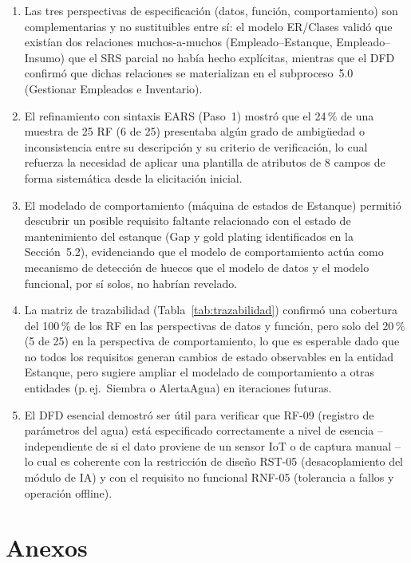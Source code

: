 \documentclass[11pt,a4paper]{report}
\begin{document}
\begin{enumerate}[leftmargin=1.2cm]
\item Las tres perspectivas de especificaci\'on (datos, funci\'on, comportamiento) son complementarias y no sustituibles entre s\'i: el modelo ER/Clases valid\'o que exist\'ian dos relaciones muchos-a-muchos (Empleado--Estanque, Empleado--Insumo) que el SRS parcial no hab\'ia hecho expl\'icitas, mientras que el DFD confirm\'o que dichas relaciones se materializan en el subproceso~5.0 (Gestionar Empleados e Inventario).
\item El refinamiento con sintaxis EARS (Paso~1) mostr\'o que el 24\,\% de una muestra de 25 RF (6 de 25) presentaba alg\'un grado de ambig\"uedad o inconsistencia entre su descripci\'on y su criterio de verificaci\'on, lo cual refuerza la necesidad de aplicar una plantilla de atributos de 8 campos de forma sistem\'atica desde la elicitaci\'on inicial.
\item El modelado de comportamiento (m\'aquina de estados de Estanque) permiti\'o descubrir un posible requisito faltante relacionado con el estado de mantenimiento del estanque (Gap y gold plating identificados en la Secci\'on~5.2), evidenciando que el modelo de comportamiento act\'ua como mecanismo de detecci\'on de huecos que el modelo de datos y el modelo funcional, por s\'i solos, no habr\'ian revelado.
\item La matriz de trazabilidad (Tabla~\ref{tab:trazabilidad}) confirm\'o una cobertura del 100\,\% de los RF en las perspectivas de datos y funci\'on, pero solo del 20\,\% (5 de 25) en la perspectiva de comportamiento, lo que es esperable dado que no todos los requisitos generan cambios de estado observables en la entidad Estanque, pero sugiere ampliar el modelado de comportamiento a otras entidades (p.\,ej.\ Siembra o AlertaAgua) en iteraciones futuras.
\item El DFD esencial demostr\'o ser \'util para verificar que RF-09 (registro de par\'ametros del agua) est\'a especificado correctamente a nivel de esencia -- independiente de si el dato proviene de un sensor IoT o de captura manual -- lo cual es coherente con la restricci\'on de dise\~no RST-05 (desacoplamiento del m\'odulo de IA) y con el requisito no funcional RNF-05 (tolerancia a fallos y operaci\'on offline).
\end{enumerate}

\chapter{Anexos}
\end{document}
